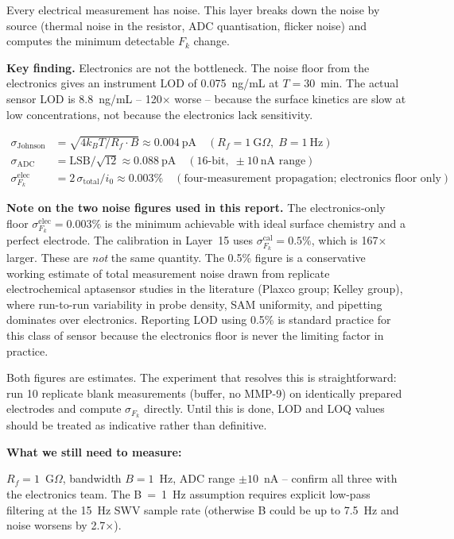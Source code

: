 \documentclass[10pt,a4paper]{article}
\newenvironment{needsbox}{%
  \begin{lrbox}{\tmpbox}\begin{minipage}{0.965\textwidth}\vspace{0.2em}%
  \textbf{\textcolor{ambertext}{What we still need to measure:}}\par\vspace{0.15em}}%
 {\vspace{0.2em}\end{minipage}\end{lrbox}%
  \par\vspace{0.4em}\noindent\colorbox{boxamber}{\usebox{\tmpbox}}\par\vspace{0.4em}}
\begin{document}
Every electrical measurement has noise. This layer breaks down the noise by source
(thermal noise in the resistor, ADC quantisation, flicker noise) and computes the
minimum detectable $F_k$ change.

\textbf{Key finding.} Electronics are not the bottleneck. The noise floor from the
electronics gives an instrument LOD of 0.075~ng/mL at $T = 30$~min. The actual
sensor LOD is 8.8~ng/mL -- 120$\times$ worse -- because the surface kinetics are slow
at low concentrations, not because the electronics lack sensitivity.

\begin{align}
\sigma_\text{Johnson} &= \sqrt{4k_BT/R_f \cdot B} \approx 0.004~\text{pA}
  \quad (R_f = 1~\text{G}\Omega,\; B = 1~\text{Hz})\\
\sigma_\text{ADC} &= \text{LSB}/\sqrt{12} \approx 0.088~\text{pA}
  \quad (16\text{-bit},\; \pm10~\text{nA range})\\
\sigma_{F_k}^\text{elec} &= 2\,\sigma_\text{total}/i_0 \approx 0.003\%
  \quad (\text{four-measurement propagation; electronics floor only})
\end{align}

\textbf{Note on the two noise figures used in this report.} The electronics-only floor
$\sigma_{F_k}^\text{elec} = 0.003\%$ is the minimum achievable with ideal surface chemistry and
a perfect electrode. The calibration in Layer~15 uses $\sigma_{F_k}^\text{cal} = 0.5\%$, which
is 167$\times$ larger. These are \textit{not} the same quantity. The 0.5\% figure is a
conservative working estimate of total measurement noise drawn from replicate electrochemical
aptasensor studies in the literature (Plaxco group; Kelley group), where run-to-run variability
in probe density, SAM uniformity, and pipetting dominates over electronics. Reporting LOD using
0.5\% is standard practice for this class of sensor because the electronics floor is never the
limiting factor in practice.

Both figures are estimates. The experiment that resolves this is straightforward: run 10 replicate
blank measurements (buffer, no MMP-9) on identically prepared electrodes and compute
$\sigma_{F_k}$ directly. Until this is done, LOD and LOQ values should be treated as
indicative rather than definitive.

\begin{needsbox}
$R_f = 1$~G$\Omega$, bandwidth $B = 1$~Hz, ADC range $\pm10$~nA -- confirm all three with
the electronics team. The B~=~1~Hz assumption requires explicit low-pass filtering at the
15~Hz SWV sample rate (otherwise B could be up to 7.5~Hz and noise worsens by 2.7$\times$).
\end{needsbox}
\end{document}

